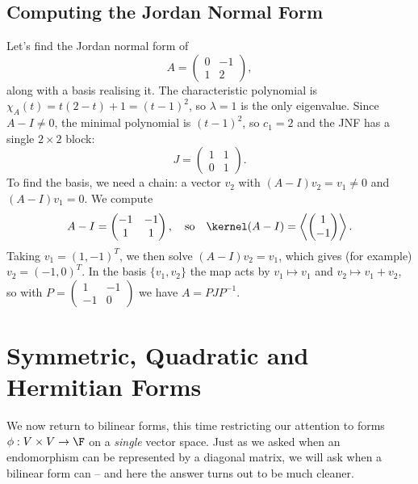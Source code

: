 \subsection{Computing the Jordan Normal Form}

\begin{example}
    Let's find the Jordan normal form of
    $$
    A = \begin{pmatrix}
        0 & -1 \\ 1 & 2
    \end{pmatrix},
    $$
    along with a basis realising it. The characteristic polynomial is $\chi_A(t) = t(2 - t) + 1 = (t-1)^2$, so $\lambda = 1$ is the only eigenvalue. Since $A - I \neq 0$, the minimal polynomial is $(t - 1)^2$, so $c_1 = 2$ and the JNF has a single $2 \times 2$ block:
    $$
    J = \begin{pmatrix}
        1 & 1 \\ 0 & 1
    \end{pmatrix}.
    $$
    To find the basis, we need a chain: a vector $v_2$ with $(A - I)v_2 = v_1 \neq 0$ and $(A - I)v_1 = 0$. We compute
    $$
    A - I = \begin{pmatrix}
        -1 & -1 \\ 1 & 1
    \end{pmatrix}, \quad \text{so} \quad \kernel(A - I) = \left\langle \begin{pmatrix} 1 \\ -1 \end{pmatrix} \right\rangle.
    $$
    Taking $v_1 = (1, -1)^T$, we then solve $(A - I)v_2 = v_1$, which gives (for example) $v_2 = (-1, 0)^T$. In the basis $\{v_1, v_2\}$ the map acts by $v_1 \mapsto v_1$ and $v_2 \mapsto v_1 + v_2$, so with $P = \begin{pmatrix} 1 & -1 \\ -1 & 0 \end{pmatrix}$ we have $A = PJP^{-1}$.
\end{example}

\section{Symmetric, Quadratic and Hermitian Forms}

We now return to bilinear forms, this time restricting our attention to forms $\phi: V \times V \rightarrow \F$ on a \emph{single} vector space. Just as we asked when an endomorphism can be represented by a diagonal matrix, we will ask when a bilinear form can -- and here the answer turns out to be much cleaner.

